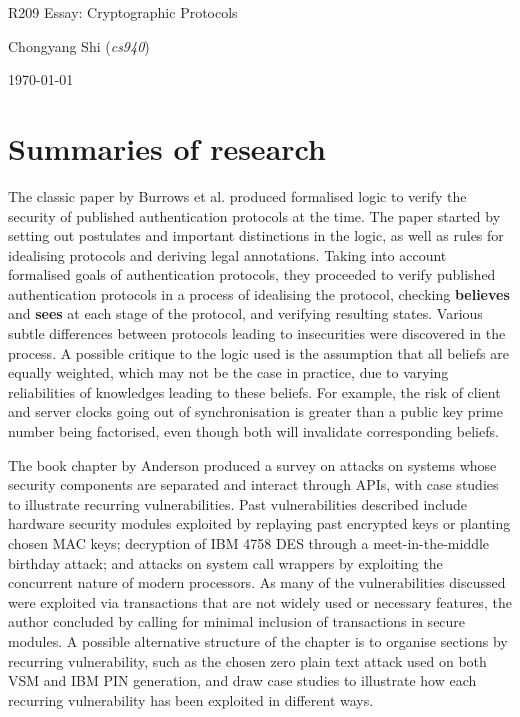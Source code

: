 \documentclass[11pt]{article}
\begin{document}
\centerline{\Large R209 Essay:  Cryptographic Protocols}
\vspace{2em}
\centerline{\large Chongyang Shi (\emph{cs940})}
\vspace{1em}
\centerline{\large \today}
\vspace{1em}

\section{Summaries of research}

The classic paper by Burrows et al. \cite{burrows1989logic} produced formalised logic to verify the security of published authentication protocols at the time. The paper started by setting out postulates and important distinctions in the logic, as well as rules for idealising protocols and deriving legal annotations. Taking into account formalised goals of authentication protocols, they proceeded to verify published authentication protocols in a process of idealising the protocol, checking \textbf{believes} and \textbf{sees} at each stage of the protocol, and verifying resulting states. Various subtle differences between protocols leading to insecurities were discovered in the process. A possible critique to the logic used is the assumption that all beliefs are equally weighted, which may not be the case in practice, due to varying reliabilities of knowledges leading to these beliefs. For example, the risk of client and server clocks going out of synchronisation is greater than a public key prime number being factorised, even though both will invalidate corresponding beliefs.

The book chapter by Anderson \cite{anderson2010security} produced a survey on attacks on systems whose security components are separated and interact through APIs, with case studies to illustrate recurring vulnerabilities. Past vulnerabilities described include hardware security modules exploited by replaying past encrypted keys or planting chosen MAC keys; decryption of IBM 4758 DES through a meet-in-the-middle birthday attack; and attacks on system call wrappers by exploiting the concurrent nature of modern processors. As many of the vulnerabilities discussed were exploited via transactions that are not widely used or necessary features, the author concluded by calling for minimal inclusion of transactions in secure modules. A possible alternative structure of the chapter is to organise sections by recurring vulnerability, such as the chosen zero plain text attack used on both VSM and IBM PIN generation, and draw case studies to illustrate how each recurring vulnerability has been exploited in different ways.
\end{document}
